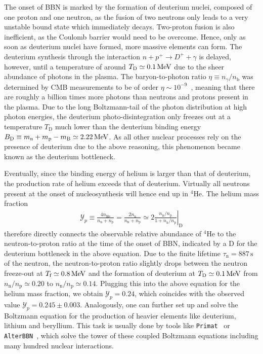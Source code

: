 The onset of \ac{BBN} is marked by the formation of deuterium nuclei, composed of one proton and one neutron, as the fusion of two neutrons only leads to a very unstable bound state which immediately decays. Two-proton fusion is also inefficient, as the Coulomb barrier would need to be overcome. Hence, only as soon as deuterium nuclei have formed, more massive elements can form. The deuterium synthesis through  the interaction $n + p^+ \rightarrow D^+ + \gamma$ is delayed, however, until a temperature of around $T_\text{D} \simeq 0.1 \, \text{MeV}$ due to the sheer abundance of photons in the plasma. The baryon-to-photon ratio $\eta \equiv n_\gamma / n_\text{b}$ was determined by CMB measurements to be of order $\eta \sim 10^{-9}$~\cite{Planck:2018vyg}, meaning that there are roughly a billion times more photons than neutrons and protons present in the plasma. Due to the long Boltzmann-tail of the photon distribution at high photon energies, the deuterium photo-disintegration only freezes out at a temperature $T_\text{D}$ much lower than the deuterium binding energy $B_\text{D} \equiv m_\text{n} + m_\text{p} - m_\text{B} \simeq 2.22 \, \text{MeV}$. As all other nuclear processes rely on the presence of deuterium due to the above reasoning, this phenomenon became known as the deuterium bottleneck.

Eventually, since the binding energy of helium is larger than that of deuterium, the production rate of helium exceeds that of deuterium. Virtually all neutrons present at the onset of nucleosynthesis will hence end up in ${}^4\text{He}$. The helium mass fraction
\begin{align}
	\mathcal{Y}_p \equiv \frac{4 n_\text{He}}{n_\text{n} +n_\text{p}} = \frac{2 n_\text{n}}{n_\text{n} + n_\text{p}} \simeq 2\left.\frac{ n_\text{n} / n_\text{p}}{1 + n_\text{n} / n_\text{p}}\right|_{\text{D}} \label{eq:Yp}
\end{align}
therefore directly connects the observable relative abundance of ${}^4\text{He}$   to the neutron-to-proton ratio at the time of the onset of BBN, indicated by a D for the deuterium bottleneck in the above equation. Due to the finite lifetime $\tau_\text{n} = 887 \, \text{s}$ of the neutron, the neutron-to-proton  ratio slightly drops between the neutron freeze-out at $T_\text{f} \simeq 0.8 \, \text{MeV}$ and the formation of deuterium at $T_\text{D} \simeq 0.1 \, \text{MeV}$ from $n_\text{n}/n_\text{p} \simeq 0.20$ to $n_\text{n}/n_\text{p} \simeq 0.14$. Plugging this into the above equation for the helium mass fraction, we obtain $\mathcal{Y}_p = 0.24$, which coincides with the observed value $\mathcal{Y}_p = 0.245 \pm 0.003$. Analogously, one can further set up and solve the Boltzmann equation for the production of heavier elements like deuterium, lithium and beryllium. This task is usually done by tools like \texttt{Primat}~\cite{Pitrou:2019nub} or \texttt{AlterBBN}~\cite{Arbey:2011nf}, which solve the tower of these coupled Boltzmann equations including many hundred nuclear interactions.

